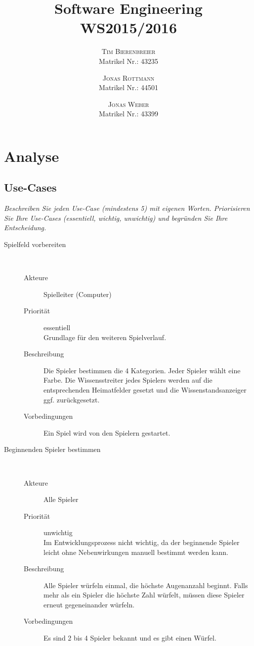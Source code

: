 \documentclass{report}
\title{Software Engineering\\\small{WS2015/2016}}
\author{
	\textsc{Tim Bierenbreier}\\
	\normalsize Matrikel Nr.: 43235
	\and
	\textsc{Jonas Rottmann}\\
	\normalsize Matrikel Nr.: 44501
	\and
	\textsc{Jonas Weber}\\
	\normalsize Matrikel Nr.: 43399
}
\begin{document}
\maketitle

\tableofcontents

\chapter{Analyse}
\section{Use-Cases}
\textit{Beschreiben Sie jeden Use-Case (mindestens 5) mit eigenen Worten. Priorisieren Sie Ihre Use-Cases (essentiell, wichtig, unwichtig) und begr\"unden Sie Ihre Entscheidung.}
\begin{description}
   \item[Spielfeld vorbereiten]~\par
   \begin{description}
      \item[Akteure] Spielleiter (Computer)
      \item[Priorität] essentiell\\Grundlage für den weiteren Spielverlauf.
      \item[Beschreibung] Die Spieler bestimmen die 4 Kategorien. Jeder Spieler wählt eine Farbe. Die Wissensstreiter jedes Spielers werden auf die entsprechenden Heimatfelder gesetzt und die Wissenstandsanzeiger ggf. zurückgesetzt.
      \item[Vorbedingungen] Ein Spiel wird von den Spielern gestartet.
   \end{description}


   \item[Beginnenden Spieler bestimmen]~\par
   \begin{description}
      \item[Akteure] Alle Spieler
      \item[Priorität] unwichtig\\Im Entwicklungsprozess nicht wichtig, da der beginnende Spieler leicht ohne Nebenwirkungen manuell bestimmt werden kann.
      \item[Beschreibung] Alle Spieler würfeln einmal, die höchste Augenanzahl beginnt. Falls mehr als ein Spieler die höchste Zahl würfelt, müssen diese Spieler erneut gegeneinander würfeln.
      \item[Vorbedingungen] Es sind 2 bis 4 Spieler bekannt und es gibt einen Würfel.
   \end{description}



\end{description}
\end{document}
